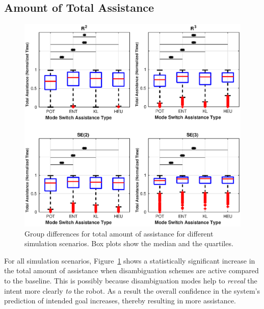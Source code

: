 \documentclass[conference]{IEEEtran}
\begin{document}
\subsection{Amount of Total Assistance}
\begin{figure}[t]
	\centering
	\includegraphics[width= 1.\hsize, height=0.6\vsize]{./figures/total_assistance.eps}
	\vspace{-0.8cm}
	\caption{Group differences for total amount of assistance for different simulation scenarios. Box plots show the median and the quartiles.} 
	\label{fig:total_assistance}
\end{figure}
For all simulation scenarios, Figure~\ref{fig:total_assistance} shows a statistically significant increase in the total amount of assistance when disambiguation schemes are active compared to the baseline. This is possibly because disambiguation modes help to \textit{reveal} the intent more clearly \textit{to} the robot. As a result the overall confidence in the system's prediction of intended goal increases, thereby resulting in more assistance. 
\end{document}
